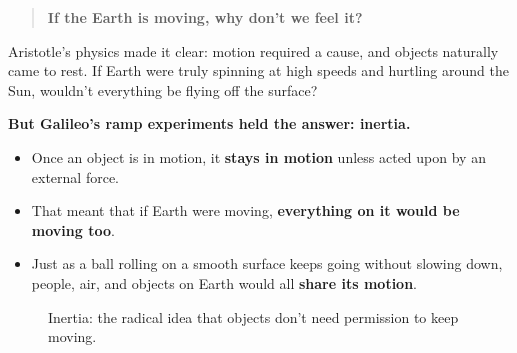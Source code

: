 \begin{quote}
    \textbf{If the Earth is moving, why don’t we feel it?}
\end{quote}

Aristotle’s physics made it clear: motion required a cause, and objects naturally came to rest. If Earth were truly spinning at high speeds and hurtling around the Sun, wouldn’t everything be flying off the surface? 

\textbf{But Galileo’s ramp experiments held the answer: inertia.}

\begin{itemize}
    \item Once an object is in motion, it \textbf{stays in motion} unless acted upon by an external force.
    \item That meant that if Earth were moving, \textbf{everything on it would be moving too}.
    \item Just as a ball rolling on a smooth surface keeps going without slowing down, people, air, and objects on Earth would all \textbf{share its motion}.
\end{itemize}

\begin{figure}[H]
\centering
{}
\caption{Inertia: the radical idea that objects don’t need permission to keep moving.}
\end{figure}


